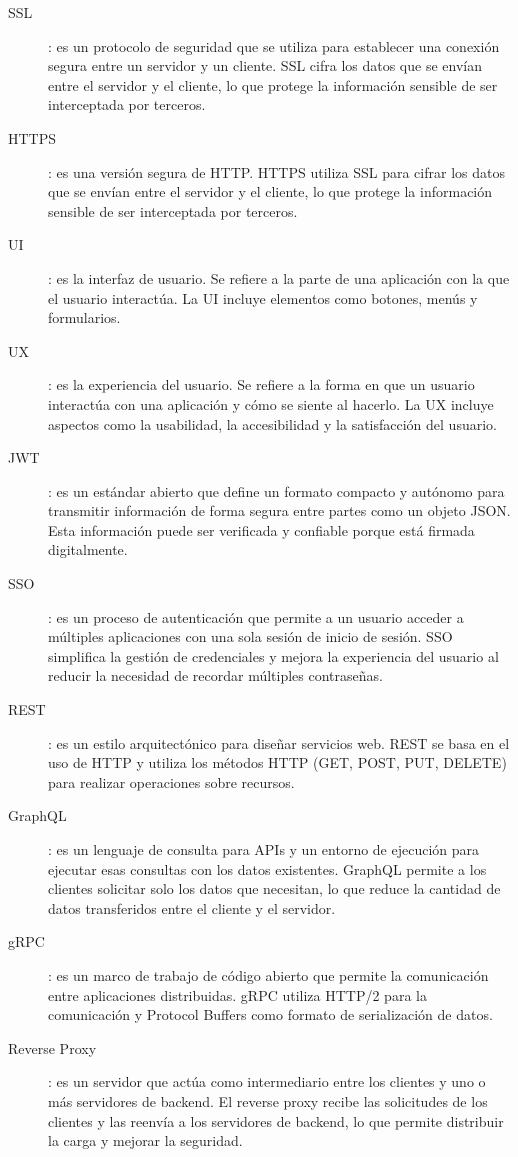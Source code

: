 \begin{description}
    \item [\hypertarget{ssl}{SSL}]: es un protocolo de seguridad que se utiliza para establecer una conexión segura entre un servidor y un cliente. SSL cifra los datos que se envían entre el servidor y el cliente, lo que protege la información sensible de ser interceptada por terceros.
    \item [\hypertarget{https}{HTTPS}]: es una versión segura de HTTP. HTTPS utiliza SSL para cifrar los datos que se envían entre el servidor y el cliente, lo que protege la información sensible de ser interceptada por terceros.
    \item [\hypertarget{ui}{UI}]: es la interfaz de usuario. Se refiere a la parte de una aplicación con la que el usuario interactúa. La UI incluye elementos como botones, menús y formularios.
    \item [\hypertarget{ux}{UX}]: es la experiencia del usuario. Se refiere a la forma en que un usuario interactúa con una aplicación y cómo se siente al hacerlo. La UX incluye aspectos como la usabilidad, la accesibilidad y la satisfacción del usuario.
    \item [\hypertarget{jwt}{JWT}]: es un estándar abierto que define un formato compacto y autónomo para transmitir información de forma segura entre partes como un objeto JSON. Esta información puede ser verificada y confiable porque está firmada digitalmente.
    \item [\hypertarget{sso}{SSO}]: es un proceso de autenticación que permite a un usuario acceder a múltiples aplicaciones con una sola sesión de inicio de sesión. SSO simplifica la gestión de credenciales y mejora la experiencia del usuario al reducir la necesidad de recordar múltiples contraseñas.
    \item [\hypertarget{rest}{REST}]: es un estilo arquitectónico para diseñar servicios web. REST se basa en el uso de HTTP y utiliza los métodos HTTP (GET, POST, PUT, DELETE) para realizar operaciones sobre recursos.
    \item [\hypertarget{graphql}{GraphQL}]: es un lenguaje de consulta para APIs y un entorno de ejecución para ejecutar esas consultas con los datos existentes. GraphQL permite a los clientes solicitar solo los datos que necesitan, lo que reduce la cantidad de datos transferidos entre el cliente y el servidor.
    \item [\hypertarget{grpc}{gRPC}]: es un marco de trabajo de código abierto que permite la comunicación entre aplicaciones distribuidas. gRPC utiliza HTTP/2 para la comunicación y Protocol Buffers como formato de serialización de datos.
    \item [\hypertarget{reverseproxy}{Reverse Proxy}]: es un servidor que actúa como intermediario entre los clientes y uno o más servidores de backend. El reverse proxy recibe las solicitudes de los clientes y las reenvía a los servidores de backend, lo que permite distribuir la carga y mejorar la seguridad.
\end{description}

\endinput